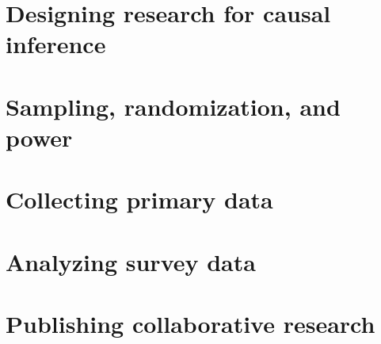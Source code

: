 \chapter{Designing research for causal inference}
\label{ch:3}




\chapter{Sampling, randomization, and power}
\label{ch:4}




\chapter{Collecting primary data}
\label{ch:5}




\chapter{Analyzing survey data}
\label{ch:6}




\chapter{Publishing collaborative research}
\label{ch:7}



